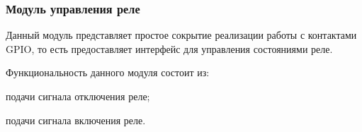 \subsubsection{Модуль управления реле}

Данный модуль представляет простое сокрытие реализации работы с контактами GPIO, то есть предоставляет интерфейс для управления состояниями реле.

Функциональность данного модуля состоит из:

\begin{itemize*}
\item подачи сигнала отключения реле;
\item подачи сигнала включения реле. 
\end{itemize*}

